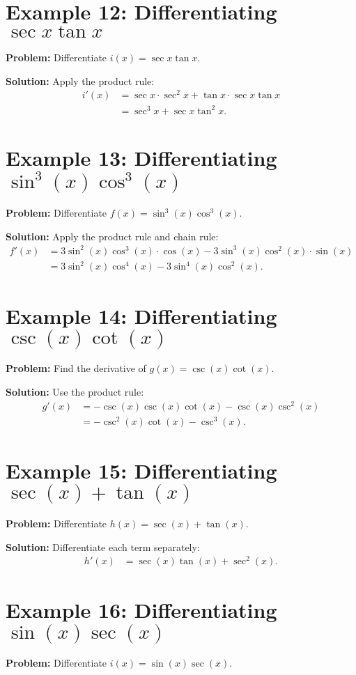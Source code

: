 \documentclass[a4paper,12pt]{book}
\begin{document}
\section*{Example 12: Differentiating $\sec x \tan x$}
\textbf{Problem:} Differentiate $i(x) = \sec x \tan x$.

\textbf{Solution:}
Apply the product rule:
\begin{align*}
i'(x) &= \sec x \cdot \sec^2 x + \tan x \cdot \sec x \tan x \\
&= \sec^3 x + \sec x \tan^2 x.
\end{align*}



\section*{Example 13: Differentiating $\sin^3(x)\cos^3(x)$}
\textbf{Problem:} Differentiate $f(x) = \sin^3(x)\cos^3(x)$.

\textbf{Solution:}
Apply the product rule and chain rule:
\begin{align*}
f'(x) &= 3\sin^2(x)\cos^3(x) \cdot \cos(x) - 3\sin^3(x)\cos^2(x) \cdot \sin(x) \\
&= 3\sin^2(x)\cos^4(x) - 3\sin^4(x)\cos^2(x).
\end{align*}

\section*{Example 14: Differentiating $\csc(x)\cot(x)$}
\textbf{Problem:} Find the derivative of $g(x) = \csc(x)\cot(x)$.

\textbf{Solution:}
Use the product rule:
\begin{align*}
g'(x) &= -\csc(x)\csc(x)\cot(x) - \csc(x)\csc^2(x) \\
&= -\csc^2(x)\cot(x) - \csc^3(x).
\end{align*}

\section*{Example 15: Differentiating $\sec(x) + \tan(x)$}
\textbf{Problem:} Differentiate $h(x) = \sec(x) + \tan(x)$.

\textbf{Solution:}
Differentiate each term separately:
\begin{align*}
h'(x) &= \sec(x)\tan(x) + \sec^2(x).
\end{align*}

\section*{Example 16: Differentiating $\sin(x)\sec(x)$}
\textbf{Problem:} Differentiate $i(x) = \sin(x)\sec(x)$.
\end{document}
